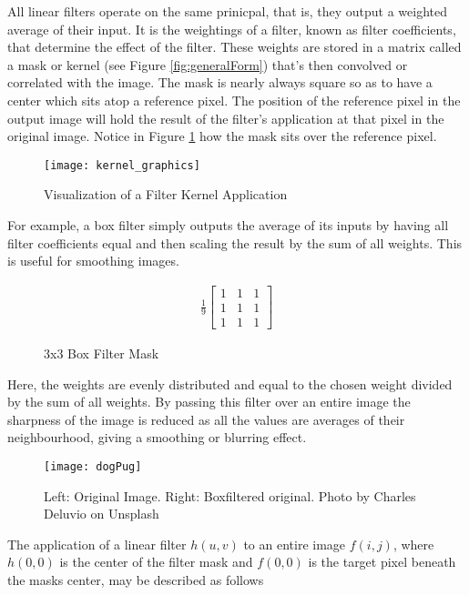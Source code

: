 All linear filters operate on the same prinicpal, that is, they output a weighted average of their input. It is the weightings of a filter, known as filter coefficients, that determine the effect of the filter. These weights are stored in a matrix called a mask or kernel (see Figure \ref{fig:generalForm}) that's then convolved or correlated with the image. The mask is nearly always square so as to have a center which sits atop a reference pixel. The position of the reference pixel in the output image will hold the result of the filter's application at that pixel in the original image. Notice in Figure \ref{fig:kernel_graphics} how the mask sits over the reference pixel.

\begin{figure}[H]
  \centering
  \centering\texttt{[image: kernel\_graphics]}
  \caption{Visualization of a Filter Kernel Application}
  \label{fig:kernel_graphics}
\end{figure}

For example, a box filter simply outputs the average of its inputs by having all filter coefficients equal and then scaling the result by the sum of all weights. This is useful for smoothing images.

\begin{figure}[H]
  \begin{gather}
    \frac{1}{9}
    \begin{bmatrix}
      1 & 1 & 1 \\
      1 & 1 & 1 \\
      1 & 1 & 1
    \end{bmatrix}
  \end{gather}
  \caption{3x3 Box Filter Mask}
\end{figure}


Here, the weights are evenly distributed and equal to the chosen weight divided by the sum of all weights. By passing this filter over an entire image the sharpness of the image is reduced as all the values are averages of their neighbourhood, giving a smoothing or blurring effect.

\begin{figure}[H]
  \centering
  \centering\texttt{[image: dogPug]}
  \caption{Left: Original Image. Right: Boxfiltered original. Photo by Charles Deluvio on Unsplash}
  \label{fig:roughDog}
\end{figure}

The application of a linear filter $h(u,v)$ to an entire image $f(i,j)$, where $h(0,0)$ is the center of the filter mask and $f(0,0)$ is the target pixel beneath the masks center, may be described as follows

